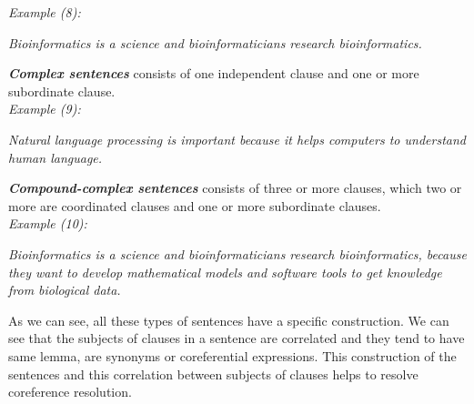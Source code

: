 \emph{Example (8):}
\begin{changemargin}{10mm}{10mm}
  \emph{Bioinformatics is a science and bioinformaticians research bioinformatics.}
\end{changemargin}
\vspace{3mm}
\newpage
\emph{\textbf{Complex sentences}} consists of one independent clause and one or more subordinate clause.\\

\emph{Example (9):}
\begin{changemargin}{10mm}{10mm}
  \emph{Natural language processing is important because it helps computers to understand human language.}
\end{changemargin}
\vspace{3mm}

\emph{\textbf{Compound-complex sentences}} consists of three or more clauses, which two or more are coordinated clauses and one or more subordinate clauses.\\

\emph{Example (10):}
\begin{changemargin}{10mm}{10mm}
  \emph{Bioinformatics is a science and bioinformaticians research bioinformatics, because they want to develop mathematical models and software tools to get knowledge from biological data.}
\end{changemargin}
 \vspace{3mm}
As we can see, all these types of sentences have a specific construction. We can see that the subjects of clauses in a sentence are correlated and they tend to have same lemma, are synonyms or coreferential expressions. This construction of the sentences and this correlation between subjects of clauses helps to resolve coreference resolution.
